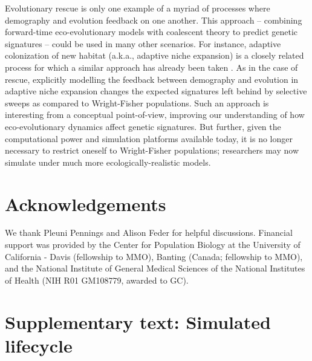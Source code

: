 \documentclass[]{article}
\begin{document}
Evolutionary rescue is only one example of a myriad of processes where demography and evolution feedback on one another. 
This approach -- combining forward-time eco-evolutionary models with coalescent theory to predict genetic signatures -- could be used in many other scenarios.
For instance, adaptive colonization of new habitat (a.k.a., adaptive niche expansion) is a closely related process for which a similar approach has already been taken \citep{kim2010signatures}.
As in the case of rescue, explicitly modelling the feedback between demography and evolution in adaptive niche expansion changes the expected signatures left behind by selective sweeps as compared to Wright-Fisher populations.
Such an approach is interesting from a conceptual point-of-view, improving our understanding of how eco-evolutionary dynamics affect genetic signatures.
But further, given the computational power and simulation platforms available today, it is no longer necessary to restrict oneself to Wright-Fisher populations; researchers may now simulate under much more ecologically-realistic models.

\section*{Acknowledgements}
We thank Pleuni Pennings and Alison Feder for helpful discussions.
Financial support was provided by the Center for Population Biology at the University of California - Davis (fellowship to MMO), Banting (Canada; fellowship to MMO), and 
the National Institute of General Medical Sciences of the National Institutes of Health (NIH R01 GM108779, awarded to GC).



\setcounter{figure}{0}
\renewcommand{\thefigure}{S\arabic{figure}}
\setcounter{table}{0}
\renewcommand{\thetable}{S\arabic{table}}
\setcounter{section}{0}
\renewcommand{\thesection}{S\arabic{section}}
\setcounter{equation}{0}
\renewcommand{\theequation}{S\arabic{equation}}

\section*{Supplementary text: Simulated lifecycle}
\label{sec:lifecycle}
\end{document}
